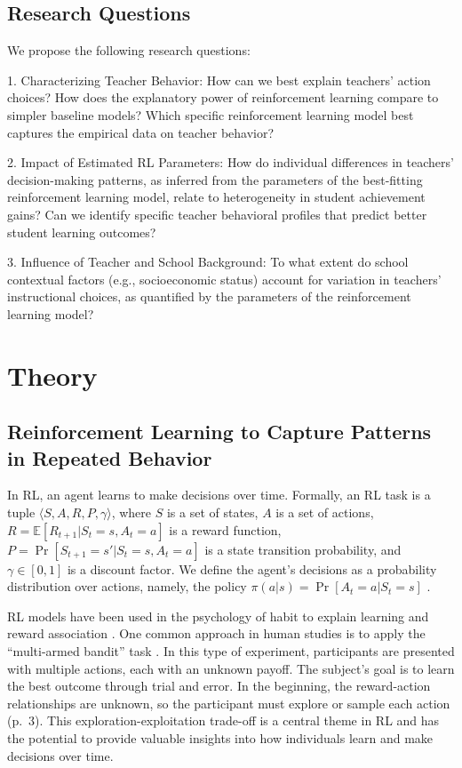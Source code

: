 \documentclass[
  number,
  preprint,
  3p,
  onecolumn]{elsarticle}
\begin{document}
\subsection{Research Questions}\label{research-questions}

We propose the following research questions:

1. Characterizing Teacher Behavior: How can we best explain teachers'
action choices? How does the explanatory power of reinforcement learning
compare to simpler baseline models? Which specific reinforcement
learning model best captures the empirical data on teacher behavior?

2. Impact of Estimated RL Parameters: How do individual differences in
teachers' decision-making patterns, as inferred from the parameters of
the best-fitting reinforcement learning model, relate to heterogeneity
in student achievement gains? Can we identify specific teacher
behavioral profiles that predict better student learning outcomes?

3. Influence of Teacher and School Background: To what extent do school
contextual factors (e.g., socioeconomic status) account for variation in
teachers' instructional choices, as quantified by the parameters of the
reinforcement learning model?

\section{Theory}\label{theory}

\subsection{Reinforcement Learning to Capture Patterns in Repeated
Behavior}\label{reinforcement-learning-to-capture-patterns-in-repeated-behavior}

In RL, an agent learns to make decisions over time. Formally, an RL task
is a tuple \(\langle S,A,R,P,\gamma \rangle\), where \(S\) is a set of
states, \(A\) is a set of actions,
\(R = \mathbb{E}[R_{t+1}|S_t = s, A_t = a]\) is a reward function,
\(P= \Pr[S_{t+1} = s′ |S_t = s,A_t = a]\) is a state transition
probability, and \(\gamma \in [0,1]\) is a discount factor. We define
the agent's decisions as a probability distribution over actions,
namely, the policy \(\pi(a|s) = \Pr[A_t = a|S_t = s]\)
\citep{sutton2018}.

RL models have been used in the psychology of habit to explain learning
and reward association \citep{thorndike1931, Rescorla1972ATO}. One
common approach in human studies is to apply the ``multi-armed bandit''
task \citep{daw2006, dennison2022}. In this type of experiment,
participants are presented with multiple actions, each with an unknown
payoff. The subject's goal is to learn the best outcome through trial
and error. In the beginning, the reward-action relationships are
unknown, so the participant must explore or sample each action
\citep{sutton2018} (p.~3). This exploration-exploitation trade-off is a
central theme in RL and has the potential to provide valuable insights
into how individuals learn and make decisions over time.
\end{document}
